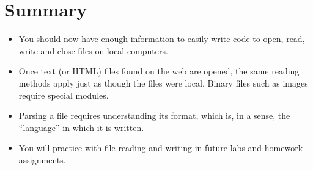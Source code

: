 \documentclass[letterpaper,10pt,english]{sphinxmanual}
\begin{document}
\section{Summary}
\label{\detokenize{lecture_notes/lec13_files_web:summary}}\begin{itemize}
\item {} 
You should now have enough information to easily write code to open,
read, write and close files on local computers.

\item {} 
Once text (or HTML) files found on the web are opened, the same
reading methods apply just as though the files were local. Binary
files such as images require special modules.

\item {} 
Parsing a file requires understanding its format, which is, in a
sense, the “language” in which it is written.

\item {} 
You will practice with file reading and writing in future labs and
homework assignments.

\end{itemize}
\end{document}
